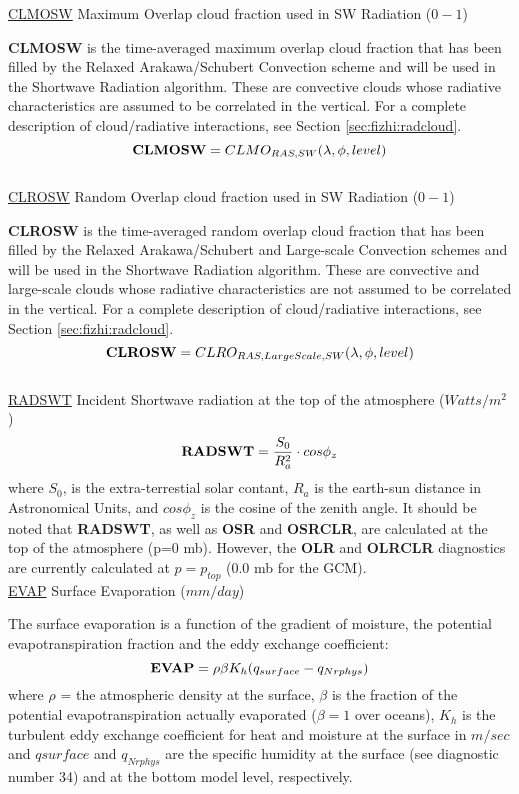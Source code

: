 \noindent
{ \underline {CLMOSW} Maximum Overlap cloud fraction used in SW Radiation ($0-1$) }

\noindent
{\bf CLMOSW} is the time-averaged maximum overlap cloud fraction that has been filled by the Relaxed
Arakawa/Schubert Convection scheme and will be used in the Shortwave Radiation algorithm.  These are
convective clouds whose radiative characteristics are assumed to be correlated in the vertical.
For a complete description of cloud/radiative interactions, see Section \ref{sec:fizhi:radcloud}.
\[
{\bf CLMOSW} = CLMO_{RAS,SW}(\lambda, \phi,  level )
\]
\\

\noindent
{ \underline {CLROSW} Random Overlap cloud fraction used in SW Radiation ($0-1$) }

\noindent
{\bf CLROSW} is the time-averaged random overlap cloud fraction that has been filled by the Relaxed
Arakawa/Schubert and Large-scale Convection schemes and will be used in the Shortwave 
Radiation algorithm.  These are
convective and large-scale clouds whose radiative characteristics are not 
assumed to be correlated in the vertical.
For a complete description of cloud/radiative interactions, see Section \ref{sec:fizhi:radcloud}.
\[
{\bf CLROSW} = CLRO_{RAS,Large Scale,SW}(\lambda, \phi,  level )
\]
\\

\noindent
{ \underline {RADSWT} Incident Shortwave radiation at the top of the atmosphere ($Watts/m^2$) }
\[
{\bf RADSWT} = {\frac{S_0}{R_a^2}} \cdot cos \phi_z
\]
\noindent
where $S_0$, is the extra-terrestial solar contant,
$R_a$ is the earth-sun distance in Astronomical Units,
and $cos \phi_z$ is the cosine of the zenith angle.
It should be noted that {\bf RADSWT}, as well as
{\bf OSR} and {\bf OSRCLR}, 
are calculated at the top of the atmosphere (p=0 mb).  However, the
{\bf OLR} and {\bf OLRCLR} diagnostics are currently
calculated at $p= p_{top}$ (0.0 mb for the GCM).
\\
   
\noindent
{ \underline {EVAP}  Surface Evaporation ($mm/day$) }

\noindent
The surface evaporation is a function of the gradient of moisture, the potential 
evapotranspiration fraction and the eddy exchange coefficient:
\[
{\bf EVAP} =  \rho \beta K_{h} (q_{surface} - q_{Nrphys})
\]
where $\rho$ = the atmospheric density at the surface, $\beta$ is the fraction of
the potential evapotranspiration actually evaporated ($\beta=1$ over oceans), $K_{h}$ is the 
turbulent eddy exchange coefficient for heat and moisture at the surface in $m/sec$ and 
$q{surface}$ and $q_{Nrphys}$ are the specific humidity at the surface (see diagnostic
number 34) and at the bottom model level, respectively.
\\

